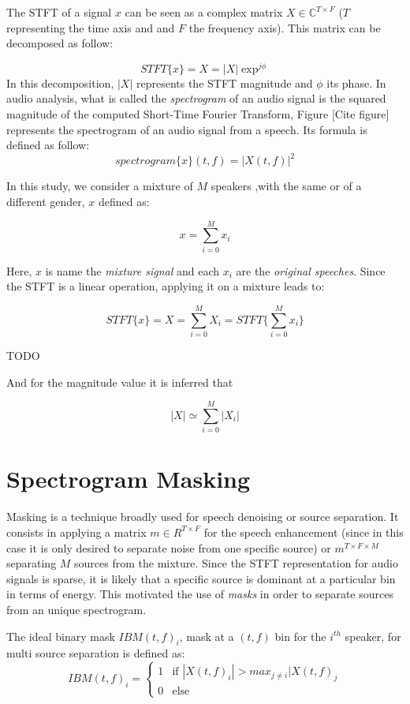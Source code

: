 \documentclass[master,final,11pt]{iscs-thesis}
\begin{document}
The STFT of a signal $x$ can be seen as a complex matrix $X \in \mathbb{C}^{T\times F}$ ($T$ representing the time axis and and $F$ the frequency axis). This matrix can be decomposed as follow:

\[
	STFT\{x\} = X = |X|\exp^{j\phi}
\]
In this decomposition, $|X|$ represents the STFT magnitude and $\phi$ its phase. In audio analysis, what is called the \textit{spectrogram} of an audio signal is the squared magnitude of the computed Short-Time Fourier Transform, Figure [Cite figure] represents the spectrogram of an audio signal from a speech. Its formula is defined as follow:
\[
	spectrogram\{x\}(t,f) =  |X(t,f)|^2
\]

In this study, we consider a mixture of $M$ speakers ,with the same or of a different gender, $x$ defined as:

\[
x = \sum_{i=0}^{M} x_i
\]

Here, $x$ is name the \textit{mixture signal} and each $x_i$ are the \textit{original speeches}. Since the STFT is a linear operation, applying it on a mixture leads to:

\[
	STFT\{x\} = X = \sum_{i=0}^{M} X_i =STFT\{\sum_{i=0}^{M} x_i\}
\]

TODO

And for the magnitude value it is inferred that

\[
|X| \simeq \sum_{i=0}^{M} |X_i|
\]

\section{Spectrogram Masking}

Masking is a technique broadly used for speech denoising or source separation. It consists in applying a matrix $m \in R^{T \times F}$ for the speech enhancement (since in this case it is only desired to separate noise from one specific source) or $m^{T \times F \times M}$ separating $M$ sources from the mixture. Since the STFT representation for audio signals is sparse, it is likely that a specific source is dominant at a particular bin in terms of energy. This motivated the use of \textit{masks} in order to separate sources from an unique spectrogram.

The ideal binary mask $IBM(t,f)_i$, mask at a $(t,f)$ bin for the $i^{th}$ speaker, for multi source separation is defined as:
\[
IBM(t,f)_i = \left\{
    \begin{array}{ll}
        1 & \mbox{if } |X(t,f)_i| > max_{j \neq i} |X(t,f)_j \\
        0 & \mbox{else}
    \end{array}
\right.
\]
\end{document}
